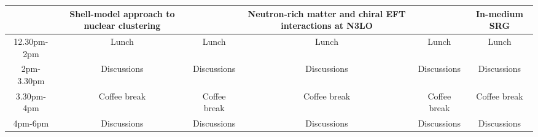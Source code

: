 \documentclass{beamer}
\begin{document}
\begin{frame}
\begin{block}{}
{\begin{tabular}{cccccc}
                & Shell-model approach to nuclear clustering                        &                                                & Neutron-rich matter and chiral EFT interactions at N3LO &                                                                             & In-medium SRG                                            \\
\hline
12.30pm-2pm     & Lunch                                                             & Lunch                                          & Lunch                                                   & Lunch                                                                       & Lunch                                                    \\
\hline
2pm-3.30pm      & Discussions                                                       & Discussions                                    & Discussions                                             & Discussions                                                                 & Discussions                                              \\
\hline
3.30pm-4pm      & Coffee break                                                      & Coffee break                                   & Coffee break                                            & Coffee break                                                                & Coffee break                                             \\
4pm-6pm         & Discussions                                                       & Discussions                                    & Discussions                                             & Discussions                                                                 & Discussions                                              \\
\hline
\end{tabular}
}

\noindent

\end{block}
\end{frame}
\end{document}
